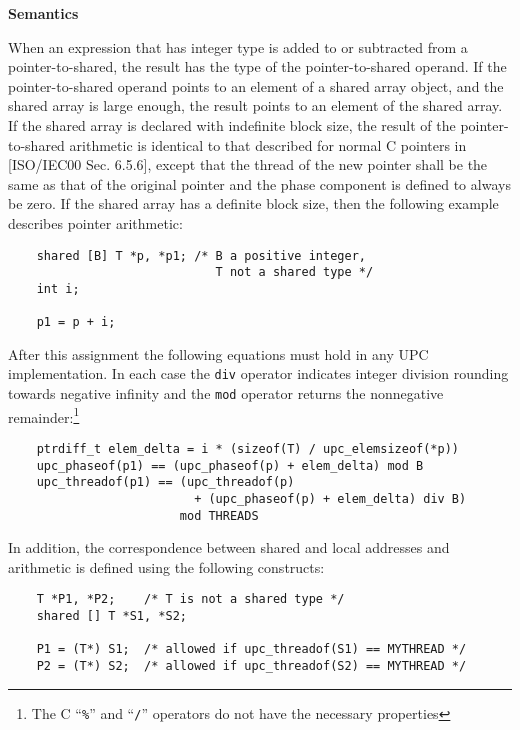 {\bf Semantics} 

\np When an expression that has integer type is added to or
     subtracted from a pointer-to-shared, the result has the type of the
     pointer-to-shared operand.  If the pointer-to-shared operand points to
     an element of a shared array object, and the shared array is
     large enough, the result points to an element of the shared
     array.  If the shared array is declared with indefinite block
     size, the result of the pointer-to-shared arithmetic is identical to
     that described for normal C pointers in [ISO/IEC00 Sec. 6.5.6],
     except that the thread of the new pointer shall be the same as
     that of the original pointer and the phase component is defined to
     always be zero.  If the shared array has a definite block size,
     then the following example describes pointer arithmetic:

      
\begin{verbatim}
    shared [B] T *p, *p1; /* B a positive integer,
                             T not a shared type */
    int i;  

    p1 = p + i;  
\end{verbatim}
    
\np After this assignment the following equations must hold
   in any UPC implementation.  In each case the {\tt div} operator
   indicates integer division rounding towards negative infinity and
   the {\tt mod} operator returns the nonnegative
   remainder:\footnote{The C ``{\tt \%}'' and ``{\tt /}''
   operators do not have the necessary properties}

\begin{verbatim}
    ptrdiff_t elem_delta = i * (sizeof(T) / upc_elemsizeof(*p))
    upc_phaseof(p1) == (upc_phaseof(p) + elem_delta) mod B
    upc_threadof(p1) == (upc_threadof(p)
                          + (upc_phaseof(p) + elem_delta) div B)
                        mod THREADS
\end{verbatim}

\np In addition, the correspondence between shared and
   local addresses and arithmetic is defined using the following
   constructs:

\begin{verbatim}
    T *P1, *P2;    /* T is not a shared type */
    shared [] T *S1, *S2;  

    P1 = (T*) S1;  /* allowed if upc_threadof(S1) == MYTHREAD */ 
    P2 = (T*) S2;  /* allowed if upc_threadof(S2) == MYTHREAD */ 
\end{verbatim}    

